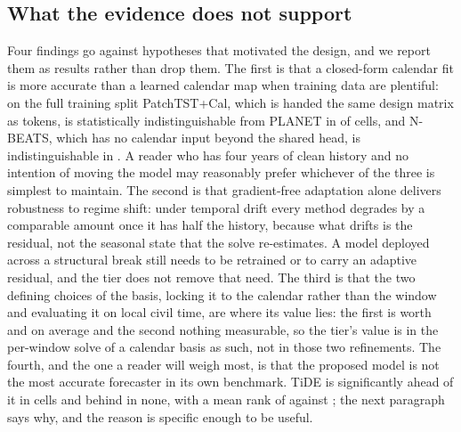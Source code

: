 \subsection{What the evidence does not support}
Four findings go against hypotheses that motivated the design, and we report them as results
rather than drop them. The first is that a closed-form calendar fit is more accurate than a
learned calendar map when training data are plentiful: on the full training split
PatchTST+Cal, which is handed the same design matrix as tokens, is statistically
indistinguishable from PLANET in  of  cells, and
N-BEATS, which has no calendar input beyond the shared head, is indistinguishable in
. A reader who has four years of clean history and no intention of moving
the model may reasonably prefer whichever of the three is simplest to maintain. The second is
that gradient-free adaptation alone delivers robustness to regime shift: under temporal drift
every method degrades by a comparable amount once it has half the history, because what
drifts is the residual, not the seasonal state that the solve re-estimates. A model deployed
across a structural break still needs to be retrained or to carry an adaptive residual, and
the tier does not remove that need. The third is that the two defining choices of the basis,
locking it to the calendar rather than the window and evaluating it on local civil time, are
where its value lies: the first is worth  and
 on average and the second nothing measurable, so the
tier's value is in the per-window solve of a calendar basis as such, not in those two
refinements. The fourth, and the one a reader will weigh most, is that the proposed model is
not the most accurate forecaster in its own benchmark. TiDE is significantly ahead of it in
 cells and behind in none, with a mean rank of 
against ; the next paragraph says why, and the reason is
specific enough to be useful.

